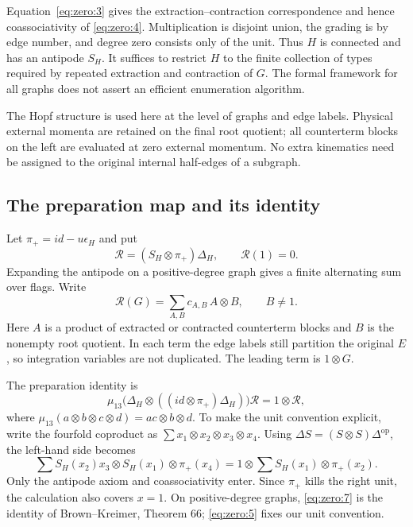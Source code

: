 \documentclass[11pt,a4paper,oneside]{article}
\theoremstyle{plain}
\theoremstyle{definition}
\theoremstyle{remark}
\numberwithin{equation}{section}
\begin{document}
Equation~\eqref{eq:zero:3} gives the extraction--contraction correspondence and hence coassociativity of \eqref{eq:zero:4}. Multiplication is disjoint union, the grading is by edge number, and degree zero consists only of the unit. Thus $H$ is connected and has an antipode \(S_H\). It suffices to restrict $H$ to the finite collection of types required by repeated extraction and contraction of $G$. The formal framework for all graphs does not assert an efficient enumeration algorithm.

The Hopf structure is used here at the level of graphs and edge labels. Physical external momenta are retained on the final root quotient; all counterterm blocks on the left are evaluated at zero external momentum. No extra kinematics need be assigned to the original internal half-edges of a subgraph.

\subsection{The preparation map and its identity}\label{sec:zero:3}
Let \(\pi_+=id-u\epsilon_H\) and put
\begin{equation}
\mathcal R=(S_H\otimes\pi_+)\Delta_H,\qquad\mathcal R(1)=0.     \label{eq:zero:5}
\end{equation}
Expanding the antipode on a positive-degree graph gives a finite alternating sum over flags. Write
\begin{equation}
\mathcal R(G)=\sum_{A,B}c_{A,B}\,A\otimes B,\qquad B\ne1.      \label{eq:zero:6}
\end{equation}
Here $A$ is a product of extracted or contracted counterterm blocks and $B$ is the nonempty root quotient. In each term the edge labels still partition the original $E$, so integration variables are not duplicated. The leading term is \(1\otimes G\).

The preparation identity is
\begin{equation}
\mu_{13}\bigl(\Delta_H\otimes((id\otimes\pi_+)\Delta_H)\bigr)
           \mathcal R
       =1\otimes\mathcal R,                                  \label{eq:zero:7}
\end{equation}
where \(\mu_{13}(a\otimes b\otimes c\otimes d)=ac\otimes b\otimes d\).
To make the unit convention explicit, write the fourfold coproduct as \(\sum x_1\otimes x_2\otimes x_3\otimes x_4\). Using \(\Delta S=(S\otimes S)\Delta^{\mathrm{op}}\), the left-hand side becomes
\begin{equation}
\sum S_H(x_2)x_3\otimes S_H(x_1)\otimes\pi_+(x_4)
   =1\otimes\sum S_H(x_1)\otimes\pi_+(x_2).
\end{equation}
Only the antipode axiom and coassociativity enter. Since \(\pi_+\) kills the right unit, the calculation also covers \(x=1\). On positive-degree graphs, \eqref{eq:zero:7} is the identity of Brown--Kreimer, Theorem 66; \eqref{eq:zero:5} fixes our unit convention.
\end{document}
